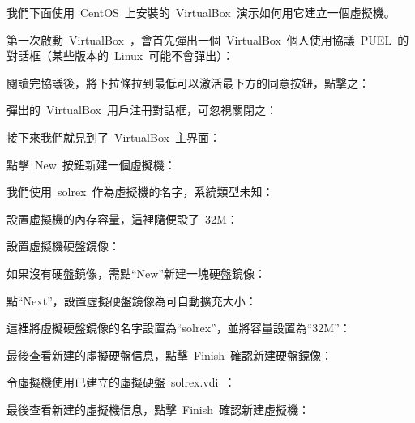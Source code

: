 我們下面使用~CentOS~上安裝的~VirtualBox~演示如何用它建立一個虛擬機。

第一次啟動~VirtualBox~，會首先彈出一個~VirtualBox~個人使用協議~PUEL~的對話框（某些版本的~Linux~可能不會彈出）：\\

閱讀完協議後，將下拉條拉到最低可以激活最下方的同意按鈕，點擊之：\\

彈出的~VirtualBox~用戶注冊對話框，可忽視關閉之：\\

接下來我們就見到了~VirtualBox~主界面：\\

點擊~New~按鈕新建一個虛擬機：\\

我們使用~solrex~作為虛擬機的名字，系統類型未知：\\

設置虛擬機的內存容量，這裡隨便設了~32M：\\

設置虛擬機硬盤鏡像：\\

如果沒有硬盤鏡像，需點“New”新建一塊硬盤鏡像：\\

點“Next”，設置虛擬硬盤鏡像為可自動擴充大小：\\

這裡將虛擬硬盤鏡像的名字設置為“solrex”，並將容量設置為“32M”：\\

最後查看新建的虛擬硬盤信息，點擊~Finish~確認新建硬盤鏡像：\\

令虛擬機使用已建立的虛擬硬盤~solrex.vdi~：\\

最後查看新建的虛擬機信息，點擊~Finish~確認新建虛擬機：\\

